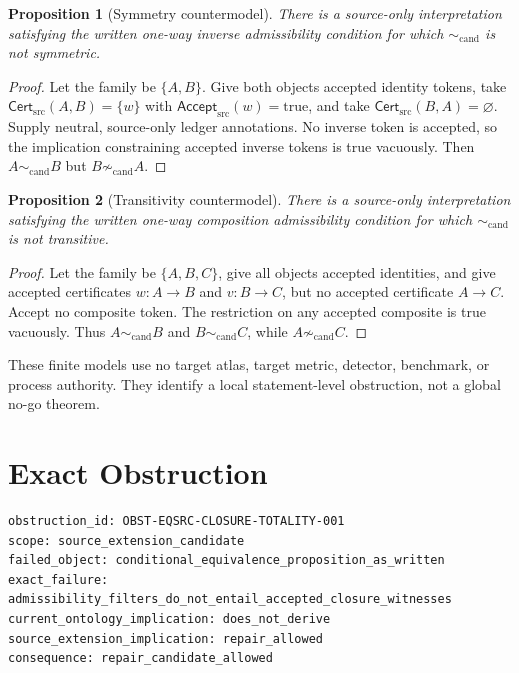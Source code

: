 \documentclass[11pt]{article}
\newtheorem{proposition}{Proposition}
\newcommand{\Cert}{\mathsf{Cert}_{\mathrm{src}}}
\newcommand{\Accept}{\mathsf{Accept}_{\mathrm{src}}}
\begin{document}
\begin{proposition}[Symmetry countermodel]
There is a source-only interpretation satisfying the written one-way inverse
admissibility condition for which \(\sim_{\mathrm{cand}}\) is not symmetric.
\end{proposition}

\begin{proof}
Let the family be \(\{A,B\}\). Give both objects accepted identity tokens,
take \(\Cert(A,B)=\{w\}\) with \(\Accept(w)=\mathrm{true}\), and take
\(\Cert(B,A)=\varnothing\). Supply neutral, source-only ledger annotations.
No inverse token is accepted, so the implication constraining accepted inverse
tokens is true vacuously. Then \(A\sim_{\mathrm{cand}}B\) but
\(B\not\sim_{\mathrm{cand}}A\).
\end{proof}

\begin{proposition}[Transitivity countermodel]
There is a source-only interpretation satisfying the written one-way
composition admissibility condition for which \(\sim_{\mathrm{cand}}\) is not
transitive.
\end{proposition}

\begin{proof}
Let the family be \(\{A,B,C\}\), give all objects accepted identities, and give
accepted certificates \(w:A\to B\) and \(v:B\to C\), but no accepted
certificate \(A\to C\). Accept no composite token. The restriction on any
accepted composite is true vacuously. Thus \(A\sim_{\mathrm{cand}}B\) and
\(B\sim_{\mathrm{cand}}C\), while
\(A\not\sim_{\mathrm{cand}}C\).
\end{proof}

These finite models use no target atlas, target metric, detector, benchmark, or
process authority. They identify a local statement-level obstruction, not a
global no-go theorem.

\section{Exact Obstruction}

\begin{verbatim}
obstruction_id: OBST-EQSRC-CLOSURE-TOTALITY-001
scope: source_extension_candidate
failed_object: conditional_equivalence_proposition_as_written
exact_failure: admissibility_filters_do_not_entail_accepted_closure_witnesses
current_ontology_implication: does_not_derive
source_extension_implication: repair_allowed
consequence: repair_candidate_allowed
\end{verbatim}
\end{document}
